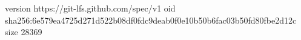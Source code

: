 version https://git-lfs.github.com/spec/v1
oid sha256:6e579ea4725d271d522b08df0fdc9deab0f0e10b50b6fac03b50fd80fbe2d12c
size 28369
